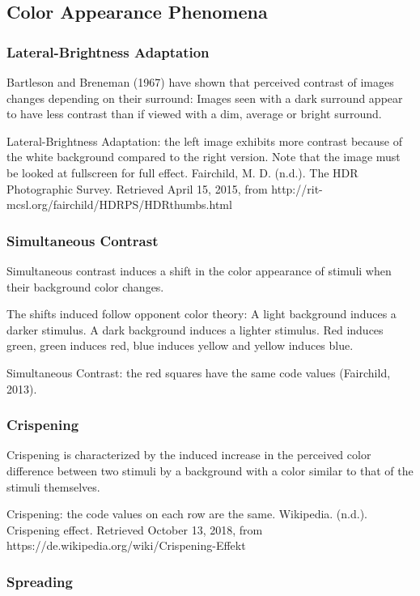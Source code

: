 \subsection{Color Appearance Phenomena}

\subsubsection{Lateral-Brightness Adaptation}

Bartleson and Breneman (1967) have shown that perceived contrast of images changes depending on their surround: Images seen with a dark surround appear to have less contrast than if viewed with a dim, average or bright surround.

Lateral-Brightness Adaptation: the left image exhibits more contrast because of the white background compared to the right version. Note that the image must be looked at fullscreen for full effect.
Fairchild, M. D. (n.d.). The HDR Photographic Survey. Retrieved April 15, 2015, from http://rit-mcsl.org/fairchild/HDRPS/HDRthumbs.html

\subsubsection{Simultaneous Contrast}
Simultaneous contrast induces a shift in the color appearance of stimuli when their background color changes.

The shifts induced follow opponent color theory:
A light background induces a darker stimulus.
A dark background induces a lighter stimulus.
Red induces green, green induces red, blue induces yellow and yellow induces blue.

Simultaneous Contrast: the red squares have the same code values (Fairchild, 2013).

\subsubsection{Crispening}

Crispening is characterized by the induced increase in the perceived color difference between two stimuli by a background with a color similar to that of the stimuli themselves.

Crispening: the code values on each row are the same.
Wikipedia. (n.d.). Crispening effect. Retrieved October 13, 2018, from https://de.wikipedia.org/wiki/Crispening-Effekt

\subsubsection{Spreading}

